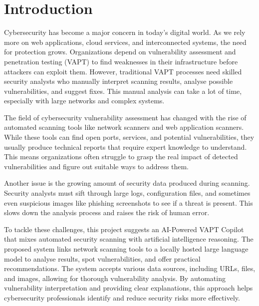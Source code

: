 \documentclass[runningheads]{llncs}
\begin{document}
\section{Introduction}

Cybersecurity has become a major concern in today’s digital world. As we rely more on web applications, cloud services, and interconnected systems, the need for protection grows. Organizations depend on vulnerability assessment and penetration testing (VAPT) to find weaknesses in their infrastructure before attackers can exploit them. However, traditional VAPT processes need skilled security analysts who manually interpret scanning results, analyse possible vulnerabilities, and suggest fixes. This manual analysis can take a lot of time, especially with large networks and complex systems.

The field of cybersecurity vulnerability assessment has changed with the rise of automated scanning tools like network scanners and web application scanners. While these tools can find open ports, services, and potential vulnerabilities, they usually produce technical reports that require expert knowledge to understand. This means organizations often struggle to grasp the real impact of detected vulnerabilities and figure out suitable ways to address them.

Another issue is the growing amount of security data produced during scanning. Security analysts must sift through large logs, configuration files, and sometimes even suspicious images like phishing screenshots to see if a threat is present. This slows down the analysis process and raises the risk of human error.

To tackle these challenges, this project suggests an AI-Powered VAPT Copilot that mixes automated security scanning with artificial intelligence reasoning. The proposed system links network scanning tools to a locally hosted large language model to analyse results, spot vulnerabilities, and offer practical recommendations. The system accepts various data sources, including URLs, files, and images, allowing for thorough vulnerability analysis. By automating vulnerability interpretation and providing clear explanations, this approach helps cybersecurity professionals identify and reduce security risks more effectively.
\end{document}
